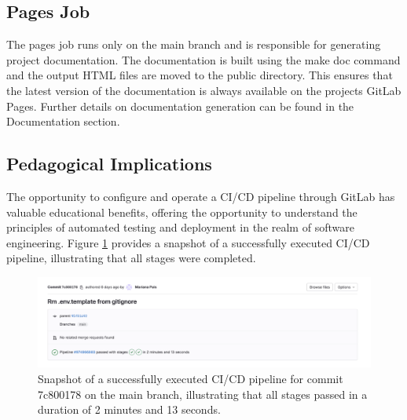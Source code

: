 \subsection{Pages Job}\label{pages-job}

The pages job runs only on the main branch and is responsible for
generating project documentation. The documentation is built using the
make doc command and the output HTML files are moved to the public
directory. This ensures that the latest version of the documentation is
always available on the project\textquotesingle s GitLab Pages. Further
details on documentation generation can be found in the Documentation
section.



\subsection{Pedagogical Implications}\label{pedagogical-implications}

The opportunity to configure and operate a CI/CD pipeline through GitLab
has valuable educational benefits, offering the opportunity to
understand the principles of automated testing and deployment in the
realm of software engineering. Figure \ref{fig:commit} provides a snapshot of a
successfully executed CI/CD pipeline, illustrating that all stages were
completed.

\begin{figure}[ht]
  \centering
  \includegraphics[width=\textwidth]{media/fig5.png}
  \caption{Snapshot of a successfully executed CI/CD pipeline for commit
  7c800178 on the main branch, illustrating that all stages passed in a
  duration of 2 minutes and 13 seconds.}
  \label{fig:commit}
\end{figure}

